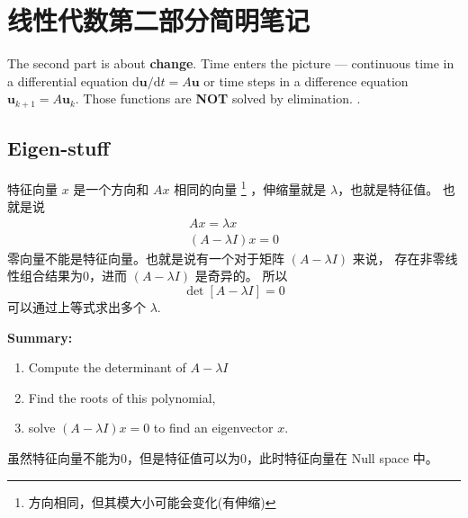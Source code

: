 \chapter{线性代数第二部分简明笔记} 

The second part is about \textbf{change}.
Time enters the picture --- continuous time in a differential
equation $\mathbf{\mathrm du}/\mathrm dt = A \mathbf u$ or
time steps in a difference equation $\mathbf u_{k + 1} = A\mathbf u_k$.
Those functions are \textbf{NOT} solved by elimination.
\cite[Chapter 6]{strang}.

\section{Eigen-stuff}

特征向量 $x$ 是一个方向和 $Ax$ 相同的向量
\footnote{方向相同，但其模大小可能会变化(有伸缩)}
，伸缩量就是 $\lambda$，也就是特征值。
也就是说 
\begin{gather*}
    Ax = \lambda x \\
    (A - \lambda I) x = 0
\end{gather*}
零向量不能是特征向量。也就是说有一个对于矩阵 $(A - \lambda I)$ 来说，
存在非零线性组合结果为0，进而 $(A - \lambda I)$ 是奇异的。
所以
\[
    \det [A - \lambda I] = 0
\]
可以通过上等式求出多个 $\lambda$.

\textbf{Summary:}
\begin{enumerate}
    \item Compute the determinant of $A - \lambda I$
    \item Find the roots of this polynomial, 
    \item solve $(A - \lambda I) x = 0$ to find an eigenvector $x$.
\end{enumerate}

虽然特征向量不能为0，但是特征值可以为0，此时特征向量在 Null space 中。

